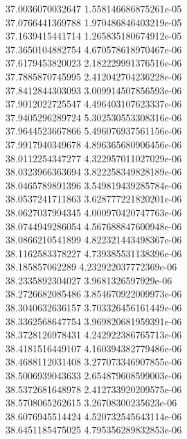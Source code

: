 {37.0036070032647 1.558146686875261e-05 \\
37.0766441369788 1.970486846403219e-05 \\
37.1639415441714 1.265835180674912e-05 \\
37.3650104882754 4.670578618970467e-06 \\
37.6179453820023 2.182229991376516e-06 \\
37.7885870745995 2.412042704236228e-06 \\
37.8412844303093 3.009914507856593e-06 \\
37.9012022725547 4.496403107623337e-06 \\
37.9405296289724 5.302530553308316e-06 \\
37.9644523667866 5.496076937561156e-06 \\
37.9917940349678 4.896365680906456e-06 \\
38.0112254347277 4.322957011027029e-06 \\
38.0323966363694 3.822258349828189e-06 \\
38.0465789891396 3.549819439285784e-06 \\
38.0537241711863 3.628777221820201e-06 \\
38.0627037994345 4.000970420747763e-06 \\
38.0744949286054 4.567688847600948e-06 \\
38.0866210541899 4.822321443498367e-06 \\
38.1162583378227 4.739385531138396e-06 \\
38.185857062289 4.232922037772369e-06 \\
38.2335892304027 3.9681326597929e-06 \\
38.2726682085486 3.854670922009973e-06 \\
38.3040632636157 3.703326456161449e-06 \\
38.3362568647754 3.969820681959391e-06 \\
38.3728126978431 4.242922386765713e-06 \\
38.4181516449107 4.160394382779486e-06 \\
38.4688112031408 3.277073346907855e-06 \\
38.5006939043633 2.654879608599003e-06 \\
38.5372681648978 2.412733920209575e-06 \\
38.5708065262615 3.26708300235623e-06 \\
38.6076945514424 4.520732545643114e-06 \\
38.6451185475025 4.795356289832853e-06 \\
}
